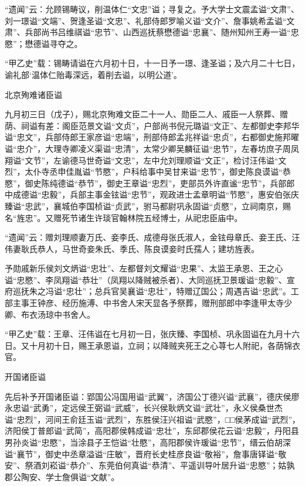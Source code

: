 \documentclass[]{article}
\begin{document}
``遗闻''云：允顾锡畴议，削温体仁``文忠''谥；寻复之。予大学士文震孟谥``文肃''、刘一璟谥``文端''、贺逢圣谥``文忠''、礼部侍郎罗喻义谥``文介''、詹事姚希孟谥``文肃''、兵部尚书吕维祺谥``忠节''、山西巡抚蔡懋德谥``忠襄''、随州知州王寿一谥``忠愍''；懋德谥寻夺之。

``甲乙史''载：锡畴请谥在六月初十日，十一日予一璟、逢圣谥；及六月二十七日，谕礼部`温体仁贻毒深远，着削去谥，以明公道'。

北京殉难诸臣谥

九月初三日（戊子），赐北京殉难文臣二十一人、勋臣二人、戚臣一人祭葬、赠荫、祠谥有差：阁臣范景文谥``文贞''，户部尚书倪元璐谥``文正''、左都御史李邦华谥``忠文''，兵部侍郎王家彦谥``忠端''，刑部侍郎孟兆祥谥``忠贞''，右都御史施邦曜谥``忠介''，大理寺卿凌义渠谥``忠清''，太常少卿吴麟征谥``忠节''，左春坊庶子周凤翔谥``文节''，左谕德马世奇谥``文忠''，左中允刘理顺谥``文正''，检讨汪伟谥``文烈''，太仆寺丞申佳胤谥``节愍''，户科给事中吴甘来谥``忠节''，御史陈良谟谥``恭愍''，御史陈纯德谥``恭节''，御史王章谥``忠烈''，吏部员外许直谧``忠节''，兵部郎中成德谥``忠毅''，兵部主事金铉谥``忠节''，观政进士孟章明谥``节愍''，惠安伯张庆臻谥``忠武''，襄城伯李国桢谥``贞武''，驸马都尉巩永固谥``贞愍''，立祠南京，赐名``旌忠''。又赠死节诸生许琰官翰林院五经博士，从祀忠臣庙中。

``遗闻''云：赠刘理顺妻万氏、妾李氏、成德母张氏淑人，金铉母章氏、妾王氏、汪伟妻耿氏恭人，马世奇妾朱氏、季氏、陈良谟妾时氏孺人；建坊旌表。

予勋戚新乐侯刘文炳谥``忠壮''、左都督刘文耀谥``忠果''、太监王承恩、王之心谥``忠愍''、李凤翔谥``恭壮''（凤翔以降贼被杀者）、大同巡抚卫景瑗谥``忠毅''、宣府巡抚朱之冯谥``忠壮''；总兵官吴襄谥``忠壮''，特赠辽国公；周遇吉谥``忠武''。工部主事王钟彦、经历施溥、中书舍人宋天显各予祭葬，赠刑部郎中李逢甲太寺少卿、布衣汤琼中书舍人。

``甲乙史''载：王章、汪伟谥在七月初一日，张庆臻、李国桢、巩永固谥在九月十六日。又十月初十日，赐王承恩谥，立祠；以降贼夹死王之心荨七人附祀，各荫锦衣官。

开国诸臣谥

先后补予开国诸臣谥：郢国公冯国用谥``武翼''，济国公丁德兴谥``武襄''，德庆侯廖永忠谥``武勇''，定远侯王弼谥``武威''，长兴侯耿炳文谥``武壮''，永义侯桑世杰谥``忠烈''，河间王俞廷玉谥``武烈''，东胜侯汪兴祖谥``武愍''，□□侯茅成谥``武烈''，济阳侯丁普郎谥``武简''，高阳郡侯韩成谥``忠壮''，东邱郡侯花云谥``忠毅''，丹阳县男孙炎谥``忠愍''，当涂县子王恺谥``壮愍''，高阳郡侯许瑗谥``忠节''，缙云伯胡深谥``襄节''，御史中丞章溢谥``庄敏''，晋府长史桂彦良谥``敬裕''，詹事唐铎谥``敬安''、祭酒刘崧谥``恭介''、东莞伯何真谥``恭清''、平遥训导叶居升谥``忠愍''；姑孰郡公陶安、学士詹俱谥``文献''。
\end{document}
